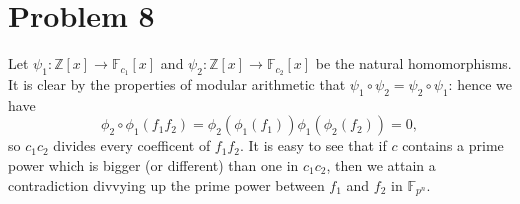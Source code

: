 \documentclass[11pt]{article}
\begin{document}

\section{Problem 8}

Let $\psi_{1} : \mathbb{Z}[x] \to \mathbb{F}_{c_{1}}[x]$ and $\psi_{2} : \mathbb{Z}[x] \to \mathbb{F}_{c_{2}}[x]$ be the natural homomorphisms. It is clear by the properties of modular arithmetic that $\psi_{1} \circ \psi_{2} = \psi_{2} \circ \psi_{1}$: hence we have
\[
  \phi_{2} \circ \phi_{1} (f_{1}f_{2}) = \phi_{2}(\phi_{1}(f_{1})) \phi_{1}(\phi_{2}(f_{2})) = 0,
\]
so $c_{1}c_{2}$ divides every coefficent of $f_{1}f_{2}$. It is easy to see that if $c$ contains a prime power which is bigger (or different) than one in $c_{1}c_{2}$, then we attain a contradiction divvying up the prime power between $f_{1}$ and $f_{2}$ in $\mathbb{F}_{p^{n}}$.

\end{document}
